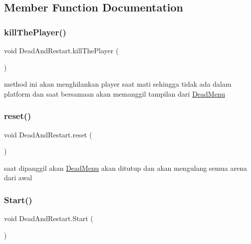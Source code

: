 \subsection{Member Function Documentation}
\hypertarget{class_dead_and_restart_a051bee469f462b949f4ce83791c2294f}{}\label{class_dead_and_restart_a051bee469f462b949f4ce83791c2294f} 
\subsubsection{\texorpdfstring{kill\+The\+Player()}{killThePlayer()}}
{\footnotesize\ttfamily void Dead\+And\+Restart.\+kill\+The\+Player (\begin{DoxyParamCaption}{ }\end{DoxyParamCaption})}



method ini akan menghilankan player saat mati sehingga tidak ada dalam platform dan saat bersamaan akan memanggil tampilan dari \hyperlink{class_dead_menu}{Dead\+Menu} 

\hypertarget{class_dead_and_restart_a38d762c09b1bcaa35a0a2cb0807c38f3}{}\label{class_dead_and_restart_a38d762c09b1bcaa35a0a2cb0807c38f3} 
\subsubsection{\texorpdfstring{reset()}{reset()}}
{\footnotesize\ttfamily void Dead\+And\+Restart.\+reset (\begin{DoxyParamCaption}{ }\end{DoxyParamCaption})}



saat dipanggil akan \hyperlink{class_dead_menu}{Dead\+Menu} akan ditutup dan akan mengulang semua arena dari awal 

\hypertarget{class_dead_and_restart_ace49e4505012656acdfdf947e22cfaab}{}\label{class_dead_and_restart_ace49e4505012656acdfdf947e22cfaab} 
\subsubsection{\texorpdfstring{Start()}{Start()}}
{\footnotesize\ttfamily void Dead\+And\+Restart.\+Start (\begin{DoxyParamCaption}{ }\end{DoxyParamCaption})\hspace{0.3cm}{\ttfamily [private]}}



